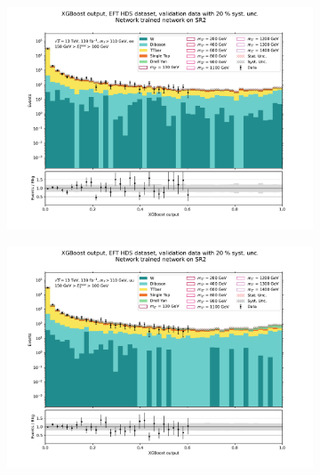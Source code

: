 \documentclass[12pt, a4paper]{book}
\begin{document}
\begin{figure}[!ht]
	\centering
	\begin{subfigure}[b]{0.49\textwidth}
      \centering
      \includegraphics[width=1\textwidth]{XGBoost/Model_independent/100-150/EFT_HDS/VAL_ee.pdf}
   \end{subfigure}
   \hfill
   \begin{subfigure}[b]{0.49\textwidth}
      \centering
      \includegraphics[width=1\textwidth]{XGBoost/Model_independent/100-150/EFT_HDS/VAL_uu.pdf}
   \end{subfigure}
   \hfill
   \begin{subfigure}[b]{0.49\textwidth}
      \centering

\end{subfigure}
\end{figure}
\end{document}
